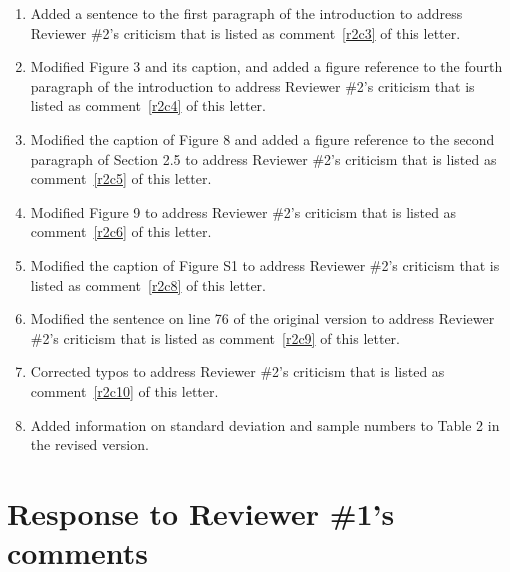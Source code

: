 \documentclass[11pt,letterpaper]{report}
\begin{document}
\begin{enumerate}[label=\textit{mc.\arabic*}]
%
\item  \label{mc1} Added a sentence to the first paragraph of the introduction to address Reviewer \#2's criticism that is listed as comment~\ref{r2c3} of this letter.
%
\item  \label{mc2} Modified Figure 3 and its caption, and added a figure reference to the fourth paragraph of the introduction to address Reviewer \#2's criticism that is listed as comment~\ref{r2c4} of this letter.
%
\item  \label{mc3} Modified the caption of Figure 8 and added a figure reference to the second paragraph of Section 2.5 to address Reviewer \#2's criticism that is listed as comment~\ref{r2c5} of this letter.
%
\item  \label{mc4} Modified Figure 9 to address Reviewer \#2's criticism that is listed as comment~\ref{r2c6} of this letter.
%
\item  \label{mc5} Modified the caption of Figure S1 to address Reviewer \#2's criticism that is listed as comment~\ref{r2c8} of this letter.
%
\item  \label{mc6} Modified the sentence on line 76 of the original version to address Reviewer \#2's criticism that is listed as comment~\ref{r2c9} of this letter.
%
\item  \label{mc7} Corrected typos to address Reviewer \#2's criticism that is listed as comment~\ref{r2c10} of this letter.
%
\item  \label{mc8} Added information on standard deviation and sample numbers to Table 2 in the revised version.
%
\end{enumerate}

\clearpage
\section*{Response to Reviewer \#1's comments}
\label{rev1}
\end{document}
